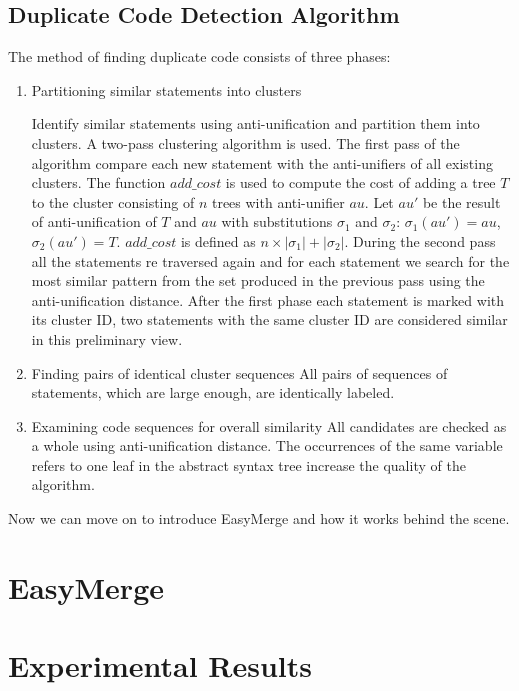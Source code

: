 \documentclass{acm_proc_article-sp}
\begin{document}
\subsection{Duplicate Code Detection Algorithm}
The method of finding duplicate code consists of three phases:
\begin{enumerate}[step 1]

    \item Partitioning similar statements into clusters
    
    Identify similar statements using anti-unification and partition them into clusters. A two-pass clustering algorithm is used. The first pass of the algorithm compare each new statement with the anti-unifiers of all existing clusters. The function $add\_cost$ is used to compute the cost of adding a tree $T$ to the cluster consisting of $n$ trees with anti-unifier $au$. Let $au'$ be the result of anti-unification of $T$ and $au$ with substitutions $\sigma_{1}$ and $\sigma_{2}$: $\sigma_{1}(au') = au$, $\sigma_{2}(au') = T$. $add\_cost$ is defined as $n \times |\sigma_{1}| + |\sigma_{2}|$. During the second pass all the statements re traversed again and for each statement we search for the most similar pattern from the set produced in the previous pass using the anti-unification distance. After the first phase each statement is marked with its cluster ID, two statements with the same cluster ID are considered similar in this preliminary view.

    \item Finding pairs of identical cluster sequences
    All pairs of sequences of statements, which are large enough, are identically labeled.
    
    \item Examining code sequences for overall similarity
    All candidates are checked as a whole using anti-unification distance. The occurrences of the same variable refers to one leaf in the abstract syntax tree increase the quality of the algorithm.
\end{enumerate}

Now we can move on to introduce EasyMerge and how it works behind the scene.


\section{EasyMerge}

\section{Experimental Results}
\end{document}
